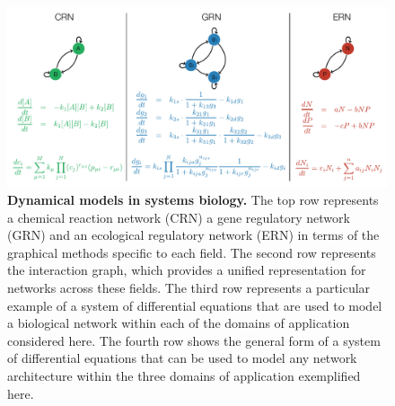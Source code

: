 
\begin{figure}[!ht]
\centering
\noindent\includegraphics[width=0.9\columnwidth]{fig/biomodelexamples.pdf}
\caption{{\bf Dynamical models in systems biology.} The top row represents a chemical reaction network (CRN) a gene regulatory network (GRN) and an ecological regulatory network (ERN) in terms of the graphical methods specific to each field. The second row represents the interaction graph, which provides a unified representation for networks across these fields. The third row represents a particular example of a system of differential equations that are used to model a biological network within each of the domains of application considered here. The fourth row shows the general form of a system of differential equations that can be used to model any network architecture within the three domains of application exemplified here.}
\label{fig:biomodelexamples}
\end{figure}

\pagebreak

